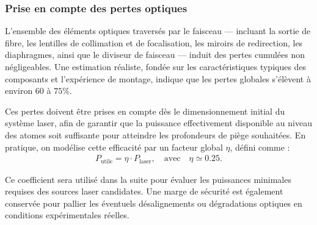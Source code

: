 \subsubsection*{Prise en compte des pertes optiques}

L’ensemble des éléments optiques traversés par le faisceau — incluant la sortie de fibre, les lentilles de collimation et de focalisation, les miroirs de redirection, les diaphragmes, ainsi que le diviseur de faisceau — induit des pertes cumulées non négligeables. Une estimation réaliste, fondée sur les caractéristiques typiques des composants et l'expérience de montage, indique que les pertes globales s’élèvent à environ $60$ à $75\%$.

Ces pertes doivent être prises en compte dès le dimensionnement initial du système laser, afin de garantir que la puissance effectivement disponible au niveau des atomes soit suffisante pour atteindre les profondeurs de piège souhaitées. En pratique, on modélise cette efficacité par un facteur global $\eta$, défini comme :
\begin{eqnarray*}
	P_{\text{utile}} = \eta \cdot P_{\text{laser}}, \quad \text{avec} \quad \eta \simeq 0.25.	
\end{eqnarray*}

Ce coefficient sera utilisé dans la suite pour évaluer les puissances minimales requises des sources laser candidates. Une marge de sécurité est également conservée pour pallier les éventuels désalignements ou dégradations optiques en conditions expérimentales réelles.

